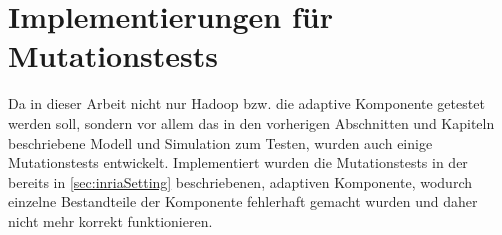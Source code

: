 \section{Implementierungen für Mutationstests}\label{sec:implMutationTests}

Da in dieser Arbeit nicht nur Hadoop bzw. die adaptive Komponente getestet werden soll, sondern vor allem das in den vorherigen Abschnitten und Kapiteln beschriebene Modell und Simulation zum Testen, wurden auch einige Mutationstests entwickelt.
Implementiert wurden die Mutationstests in der bereits in \autoref{sec:inriaSetting} beschriebenen, adaptiven Komponente, wodurch einzelne Bestandteile der Komponente fehlerhaft gemacht wurden und daher nicht mehr korrekt funktionieren.

